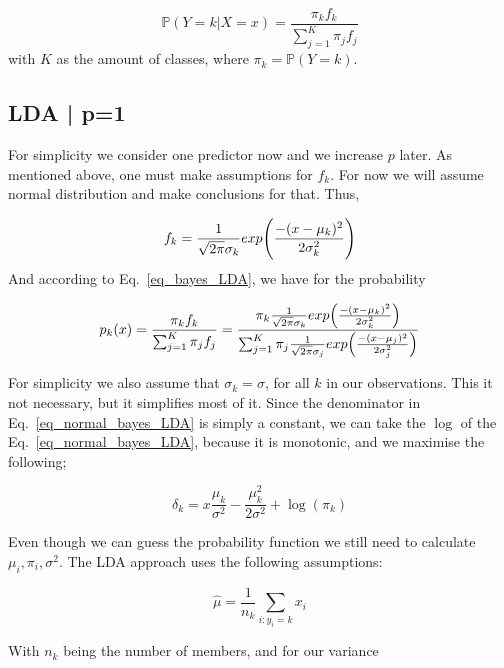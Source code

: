 \documentclass{article}
\newcommand{\bP}{\mathbb{P}} %
\begin{document}
\begin{equation}\label{eq_bayes_LDA}
    \mathbb{P}(Y=k|X=x) = \frac{\pi_{k}f_{k}}{\sum_{j=1}^{K}\pi_{j}f_{j}}
\end{equation}
with $K$ as the amount of classes, where $\pi_k = \bP(Y = k)$.

\subsection{LDA | p=1}
For simplicity we consider one predictor now and we increase $p$ later. As mentioned above, one must make assumptions for $f_{k}$. For now we will assume normal distribution and make conclusions for that.
 Thus, 
 
\begin{equation}\label{eq_1D_normal_LDA_def}
    f_{k}= \frac{1}{\sqrt{2\pi}\sigma_k}exp \Bigg{(}\frac{-(x-\mu_k)^2}{2\sigma_k^2}  \Bigg{)}
\end{equation}
And according to Eq.~\eqref{eq_bayes_LDA}, we have for the probability

\begin{equation}\label{eq_normal_bayes_LDA}
    p_{k}(x) = \frac{\pi_{k}f_{k}}{\sum_{j=1}^{K}\pi_{j}f_{j}}  = \frac{\pi_{k}\frac{1}{\sqrt{2\pi}\sigma_k}exp \Big{(}\frac{-(x-\mu_k)^2}{2\sigma_k^2}  \Big{)}  }{\sum_{j=1}^K \pi_{j}  \frac{1}{\sqrt{2\pi}\sigma_j}exp \Big{(}\frac{-(x-\mu_j)^2}{2\sigma_j^2}  \Big{)}}
\end{equation}

For simplicity we also assume that $\sigma_k=\sigma$, for all $k$ in our observations. This it not necessary, but it simplifies most of it.
Since the denominator in Eq.~\eqref{eq_normal_bayes_LDA} is simply a constant, we can take the $\log$ of the Eq.~\eqref{eq_normal_bayes_LDA}, because it is monotonic, and we maximise the following;

\begin{equation}\label{eq_delta_bayes_1D}
  \delta_{k}=x \frac{\mu_k}{\sigma^2} - \frac{\mu_k^2}{2 \sigma^2} + \log(\pi_k)
\end{equation}

Even though we can guess the probability function we still need to calculate $\mu_i,\pi_i,\sigma^2$. The LDA approach uses the following assumptions:

\begin{equation}
    \hat{\mu} = \frac{1}{n_k}\sum_{i:y_i=k}x_i
\end{equation}

With $n_k$ being the number of members, and for our variance
\end{document}
